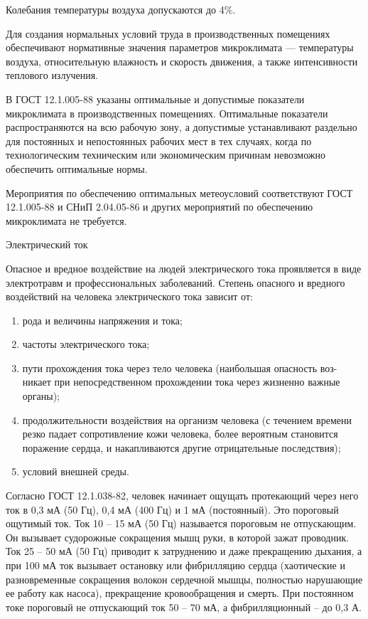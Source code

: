 Колебания температуры воздуха допускаются до 4\%.

Для создания нормальных условий труда в производственных помещениях обеспечивают нормативные значения параметров микроклимата --- температуры воздуха, относительную влажность и скорость движения, а также интенсивности теплового излучения.

В ГОСТ 12.1.005-88 указаны оптимальные и допустимые показатели микроклимата в производственных помещениях.
Оптимальные показатели распространяются на всю рабочую зону, а допустимые устанавливают раздельно для постоянных и непостоянных рабочих мест в тех случаях, когда по технологическим техническим или экономическим причинам невозможно обеспечить оптимальные нормы.

Мероприятия по обеспечению оптимальных метеоусловий соответствуют ГОСТ 12.1.005-88 и СНиП 2.04.05-86 и других мероприятий по обеспечению микроклимата не требуется.

\point Электрический ток

Опасное и вредное воздействие на людей электрического тока проявляется в виде электротравм и профессиональных заболеваний.
Степень опасного и вредного воздействий на человека электрического тока зависит от:

\begin{enumerate}
	\item рода и величины напряжения и тока; 
	\item частоты электрического тока;
	\item пути прохождения тока через тело человека (наибольшая опасность воз-никает при непосредственном прохождении тока через жизненно важные органы);
	\item продолжительности воздействия на организм человека (с течением времени резко падает сопротивление кожи человека, более вероятным становится поражение сердца, и накапливаются другие отрицательные последствия);
	\item условий внешней среды.
\end{enumerate}

Согласно ГОСТ 12.1.038-82, человек начинает ощущать протекающий через него ток в 0,3 мА (50 Гц), 0,4 мА (400 Гц) и 1 мА (постоянный).
Это пороговый ощутимый ток.
Ток 10 – 15 мА (50 Гц) называется пороговым не отпускающим.
Он вызывает судорожные сокращения мышц руки, в которой зажат проводник.
Ток 25 – 50 мА (50 Гц) приводит к затруднению и даже прекращению дыхания, а при 100 мА ток вызывает остановку или фибрилляцию сердца (хаотические и разновременные сокращения волокон сердечной мышцы, полностью нарушающие ее работу как насоса), прекращение кровообращения и смерть.
При постоянном токе пороговый не отпускающий ток 50 – 70 мА, а фибрилляционный – до 0,3 А.

